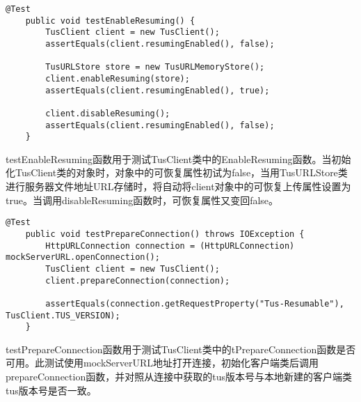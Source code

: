 \documentclass[bachelor]{thesis-uestc}
\begin{document}
\begin{lstlisting}[title=testEnableResuming测试函数]
    @Test
    public void testEnableResuming() {
        TusClient client = new TusClient();
        assertEquals(client.resumingEnabled(), false);

        TusURLStore store = new TusURLMemoryStore();
        client.enableResuming(store);
        assertEquals(client.resumingEnabled(), true);

        client.disableResuming();
        assertEquals(client.resumingEnabled(), false);
    }
\end{lstlisting}
\par testEnableResuming函数用于测试TusClient类中的EnableResuming函数。当初始化TusClient类的对象时，对象中的可恢复属性初试为false，当用TusURLStore类进行服务器文件地址URL存储时，将自动将client对象中的可恢复上传属性设置为true。当调用disableResuming函数时，可恢复属性又变回false。

\begin{lstlisting}[title=testPrepareConnection测试函数]
    @Test
    public void testPrepareConnection() throws IOException {
        HttpURLConnection connection = (HttpURLConnection) mockServerURL.openConnection();
        TusClient client = new TusClient();
        client.prepareConnection(connection);

        assertEquals(connection.getRequestProperty("Tus-Resumable"), TusClient.TUS_VERSION);
    }
\end{lstlisting}
\par testPrepareConnection函数用于测试TusClient类中的tPrepareConnection函数是否可用。此测试使用mockServerURL地址打开连接，初始化客户端类后调用prepareConnection函数，并对照从连接中获取的tus版本号与本地新建的客户端类tus版本号是否一致。
\end{document}
